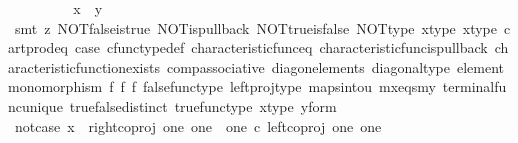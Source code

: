 \begin{isabellebody}
\ \ \ \ \ \ \isamarkupfalse%
\ \isamarkupfalse%
\ {\isachardoublequoteopen}x\ {\isacharequal}{\kern0pt}\ y{\isachardoublequoteclose}\isanewline
\ \ \ \ \ \ \ \ \isamarkupfalse%
\ {\isacharparenleft}{\kern0pt}smt\ {\isacharparenleft}{\kern0pt}z{}{\isacharparenright}{\kern0pt}\ NOT{\isacharunderscore}{\kern0pt}false{\isacharunderscore}{\kern0pt}is{\isacharunderscore}{\kern0pt}true\ NOT{\isacharunderscore}{\kern0pt}is{\isacharunderscore}{\kern0pt}pullback\ NOT{\isacharunderscore}{\kern0pt}true{\isacharunderscore}{\kern0pt}is{\isacharunderscore}{\kern0pt}false\ NOT{\isacharunderscore}{\kern0pt}type\ x{\isacharunderscore}{\kern0pt}type\ x{\isacharunderscore}{\kern0pt}type{\isacharprime}{\kern0pt}\ cart{\isacharunderscore}{\kern0pt}prod{\isacharunderscore}{\kern0pt}eq{}\ case{}\ cfunc{\isacharunderscore}{\kern0pt}type{\isacharunderscore}{\kern0pt}def\ characteristic{\isacharunderscore}{\kern0pt}func{\isacharunderscore}{\kern0pt}eq\ characteristic{\isacharunderscore}{\kern0pt}func{\isacharunderscore}{\kern0pt}is{\isacharunderscore}{\kern0pt}pullback\ characteristic{\isacharunderscore}{\kern0pt}function{\isacharunderscore}{\kern0pt}exists\ comp{\isacharunderscore}{\kern0pt}associative\ diag{\isacharunderscore}{\kern0pt}on{\isacharunderscore}{\kern0pt}elements\ diagonal{\isacharunderscore}{\kern0pt}type\ element{\isacharunderscore}{\kern0pt}monomorphism\ f{}\ f{}\ f{}\ false{\isacharunderscore}{\kern0pt}func{\isacharunderscore}{\kern0pt}type\ left{\isacharunderscore}{\kern0pt}proj{\isacharunderscore}{\kern0pt}type\ maps{\isacharunderscore}{\kern0pt}into{\isacharunderscore}{\kern0pt}{}u{}\ mx{\isacharunderscore}{\kern0pt}eqs{\isacharunderscore}{\kern0pt}my\ terminal{\isacharunderscore}{\kern0pt}func{\isacharunderscore}{\kern0pt}unique\ true{\isacharunderscore}{\kern0pt}false{\isacharunderscore}{\kern0pt}distinct\ true{\isacharunderscore}{\kern0pt}func{\isacharunderscore}{\kern0pt}type\ x{\isacharunderscore}{\kern0pt}type\ y{\isacharunderscore}{\kern0pt}form{\isacharparenright}{\kern0pt}\isanewline
\ \ \ \ \isamarkupfalse%
\isanewline
\ \ \ \ \ \ \isamarkupfalse%
\ not{\isacharunderscore}{\kern0pt}case{}{\isacharcolon}{\kern0pt}\ {\isachardoublequoteopen}x\ {\isasymnoteq}\ right{\isacharunderscore}{\kern0pt}coproj\ one\ {\isacharparenleft}{\kern0pt}one\ {\isasymCoprod}\ one{\isacharparenright}{\kern0pt}\ {\isasymcirc}\isactrlsub c\ left{\isacharunderscore}{\kern0pt}coproj\ one\ one{\isachardoublequoteclose}\isanewline

\end{isabellebody}
